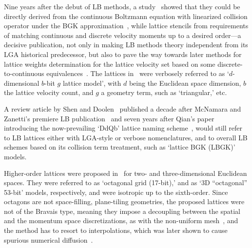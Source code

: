     Nine years after the debut of LB methods, a study~\cite{1997-HeX+LuoLS-PhysRevE} showed that they could be directly  derived
    from    the    continuous    Boltzmann    equation    with    linearized    collision     operator     under     the     BGK
    approximation~\cite{2011-HarrisS-Dover}, while lattice stencils  from  requirements  of  matching  continuous  and  discrete
    velocity moments up to a desired order---a decisive publication, not only in making LB methods theory independent  from  its
    LGA historical predecessor, but also to pave the way towards later methods for lattice weights determination for the lattice
    velocity     set     based     on      some      discrete-to-continuous      equivalences~\cite{2006-ShanX+ChenH-JFluidMech,
    2006-PhilippiPC+SurmasR-PhysRevE}.  The  lattices  in~\cite{1997-HeX+LuoLS-PhysRevE}   were   verbosely   referred   to   as
    `$d$-dimensional $b$-bit $g$ lattice model', with $d$ being the Euclidean space dimension, $b$ the lattice  velocity  count,
    and $g$ a geometry term, such as `triangular,' etc.

    A review article by Shen and  Doolen~\cite{1998-ChenS+DoolenGD-AnnuRevFluidMech}  published  a  decade  after  McNamara  and
    Zanetti's premiere LB publication~\cite{1988-McNamaraGR+ZanettiG-PhysRevLett} and seven years after Qian's paper introducing
    the now-prevailing `DdQb' lattice naming scheme~\cite{1991-QianYH+LallemandP-AdvKinTheoContMech}, would still  refer  to  LB
    lattices either with LGA-style or verbose nomenclatures, and to overall LB schemes based on its  collision  term  treatment,
    such as `lattice BGK (LBGK)' models.

    Higher-order lattices were proposed  in~\cite{1998-PavloP+VahalaL-PhysRevLett}  for  two-  and  three-dimensional  Euclidean
    spaces. They were referred to as `octagonal grid (17-bit),' and as `3D ``octagonal'' 53-bit' models, respectively, and  were
    isotropic up to the sixth-order. Since octagons are not space-filling, plane-tiling geometries, the proposed  lattices  were
    not of the Bravais type, meaning they impose a decoupling between the spatial and the  momentum  space  discretizations,  as
    with the non-uniform mesh~\cite{1996-HeX+DemboM-JComputPhys}, and the method has to  resort  to  interpolations,  which  was
    later shown to cause spurious numerical diffusion~\cite[p.~429]{2006-ShanX+ChenH-JFluidMech}.

